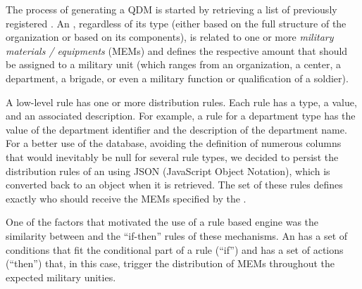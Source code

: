 The process of generating a QDM is started by retrieving a list of 
previously registered \callers. An \shc, regardless of its type (either based on the 
full structure of the organization or based on its components), 
is related to one or more \emph{military materials / equipments} (MEMs) 
and defines the respective amount that should be assigned to a military 
unit (which ranges from an organization, a center, a department, a brigade, or even 
a military function or qualification of a soldier). 

A low-level rule has one or more distribution rules. Each rule has a type, 
a value, and an associated description. For example, a rule for a 
department type has the value of the department identifier and the description of 
the department name. For a better use of the database, avoiding the definition 
of numerous columns that would inevitably be null for several rule types, we decided 
to persist the distribution rules of an \shc using JSON (JavaScript Object Notation), which is 
converted back to an object when it is retrieved. The set of these rules defines 
exactly who should receive the MEMs specified by the \shc.


One of the factors that motivated the use of a rule based engine was 
the similarity between \callers and the ``if-then'' rules of these mechanisms.  
An \shc has a set of conditions that fit the conditional part of a rule (``if'') 
and has a set of actions (``then'') that, in this case, trigger the distribution 
of MEMs throughout the expected military unities.




